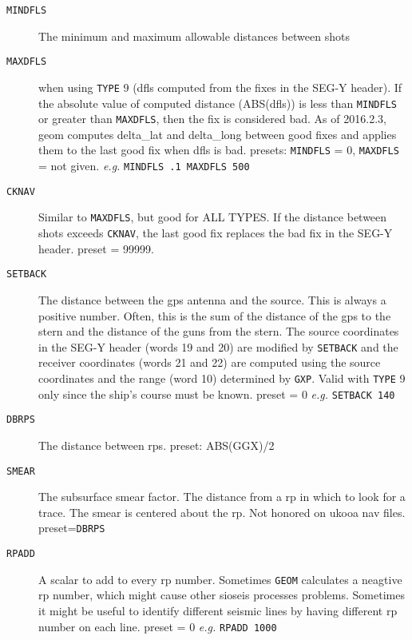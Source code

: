 \begin{description}
\item[\texttt{MINDFLS}] The minimum and maximum allowable distances between \glspl{shot}
\item[\texttt{MAXDFLS}] when using \texttt{TYPE} 9 (dfls computed from the fixes in the SEG-Y header).
         If the absolute value of computed distance (ABS(dfls)) is less than
         \texttt{MINDFLS} or greater than \texttt{MAXDFLS}, then the fix is considered bad.
         As of 2016.2.3, geom computes delta\_lat and delta\_long between good
         fixes and applies them to the last good fix when dfls is bad.
         \Gls{preset}s:   \texttt{MINDFLS} = 0, \texttt{MAXDFLS} = not given.
         \textit{e.g.}  \texttt{MINDFLS .1 MAXDFLS 500}

\item[\texttt{CKNAV}] Similar to \texttt{MAXDFLS}, but good for ALL TYPES.  If the distance
         between \glspl{shot} exceeds \texttt{CKNAV}, the last good fix replaces the
         bad fix in the SEG-Y header.
         \Gls{preset} = 99999.

\item[\texttt{SETBACK}] The distance between the \gls{gps} antenna and the source.  This is
         always a positive number.  Often, this is the sum of the
         distance of the \gls{gps} to the stern and the distance of the guns
         from the stern.  The source coordinates in the SEG-Y header
         (words 19 and 20) are modified by \texttt{SETBACK} and the receiver
         coordinates (words 21 and 22) are computed using the source
         coordinates and the range (word 10) determined by \texttt{GXP}.  Valid
         with \texttt{TYPE} 9 only since the ship's course must be known.
         \Gls{preset} = 0   \textit{e.g.}  \texttt{SETBACK 140}

\item[\texttt{DBRPS}] The distance between \glspl{rp}.
         \Gls{preset}:   ABS(GGX)/2

\item[\texttt{SMEAR}] The subsurface smear factor.  The distance from a \gls{rp} in which
         to look for a trace.  The smear is centered about the \gls{rp}.
         Not honored on \gls{ukooa} nav files.
         \Gls{preset}=\texttt{DBRPS}

\item[\texttt{RPADD}] A scalar to add to every \gls{rp} number.  Sometimes \texttt{GEOM} calculates
         a neagtive \gls{rp} number, which might cause other sioseis processes
         problems.  Sometimes it might be useful to identify different
         seismic lines by having different \gls{rp} number on each line.
         \Gls{preset} = 0        \textit{e.g.}   \texttt{RPADD 1000}


\end{description}
